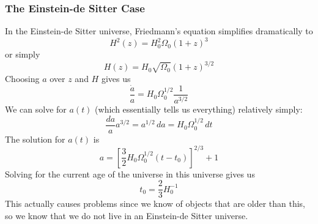 \documentclass[10pt]{article}
\numberwithin{equation}{section}
\begin{document}
		\subsubsection{The Einstein-de Sitter Case} %
		\label{ssub:the_einstein_de_sitter_case}
			In the Einstein-de Sitter universe, Friedmann's equation simplifies dramatically to
			\begin{equation}
				\label{eq:dynamics:20} H^2(z) = H_0^2\Omega_0(1+z)^3
			\end{equation}
			or simply
			\begin{equation}
				\label{eq:dynamics:21} H(z) = H_0\sqrt{\Omega_0}(1+z)^{3/2}
			\end{equation}
			Choosing $a$ over $z$ and $H$ gives us
			\begin{equation}
				\label{eq:dynamics:22} \frac{\dot{a}}{a} = H_0\Omega_0^{1/2}\frac{1}{a^{3/2}}
			\end{equation}
			We can solve for $a(t)$ (which essentially tells us everything) relatively simply:
			\begin{equation}
				\label{eq:dynamics:23} \frac{da}{a}a^{3/2} = a^{1/2}\,da = H_0\Omega_0^{1/2}\,dt
			\end{equation}
			The solution for $a(t)$ is
			\begin{equation}
				\label{eq:dynamics:24} a = \left[\frac{3}{2}H_0 \Omega_0^{1/2}(t-t_0)\right]^{2/3}+1
			\end{equation}
			Solving for the current age of the universe in this universe gives us
			\begin{equation}
				\label{eq:dynamics:25} t_0 = \frac{2}{3}H_0^{-1}
			\end{equation}
			This actually causes problems since we know of objects that are older than this, so we know that we do not live in an Einstein-de Sitter universe.
		

\end{document}
